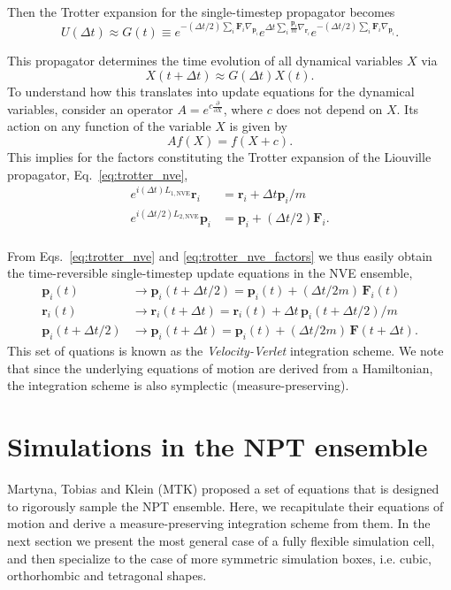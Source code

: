 \documentclass[12pt,letter]{article}
\renewcommand{\vec}[1]{\mathbf{#1}}
\begin{document}
Then the Trotter expansion for the single-timestep propagator becomes
\begin{equation}
U(\Delta t) \approx G(t) \equiv e^{-(\Delta t/2) \sum_i \vec F_i \nabla_{\vec{p}_i}} e^{\Delta t \sum_i \frac{\vec p_i}{m} \nabla_{\vec{r}_i}} e^{-(\Delta t/2) \sum_i \vec F_i \nabla_{\vec{p}_i}}.
\label{eq:trotter_nve}
\end{equation}

This propagator determines the time evolution of all dynamical variables $X$
via
\begin{equation}
X(t+\Delta t) \approx G(\Delta t) X(t).
\end{equation}
To understand how this translates into update equations for the dynamical
variables, consider an operator
$A = e^{c \frac{\partial}{\partial X}}$,
where $c$ does not depend on $X$. Its action on any function of the variable
$X$ is given by
\begin{equation}
A f(X) = f(X+c).
\label{eq:direct_translation}
\end{equation}
This implies for the factors constituting the Trotter expansion of the 
Liouville propagator, Eq.~\eqref{eq:trotter_nve},
\begin{align}
e^{i (\Delta t) L_{1,\mathrm{NVE}}} \vec r_i &= \vec r_i + \Delta t \vec p_i/m \\
e^{i (\Delta t/2) L_{2,\mathrm{NVE}}} \vec p_i &= \vec p_i + (\Delta t/2) \vec F_i. \\
\label{eq:trotter_nve_factors}
\end{align}

From Eqs.~\eqref{eq:trotter_nve} and
\eqref{eq:trotter_nve_factors} we thus easily obtain the time-reversible
single-timestep update equations in the NVE ensemble,
\begin{align}
\vec p_i(t) &\to \vec p_i(t+\Delta t/2) = \vec p_i(t) + (\Delta t/2m)\, \vec F_i(t)\\
\vec r_i(t) &\to \vec r_i(t+\Delta t) = \vec r_i(t) + \Delta t\, \vec p_i(t+\Delta t/2)/m\\
\vec p_i(t+\Delta t/2) &\to \vec p_i(t+\Delta t) = \vec p_i(t) + (\Delta t/2m)\, \vec F(t+\Delta t).
\end{align}
This set of quations is known as the {\em Velocity-Verlet} integration scheme.
We note that since the underlying equations of motion are derived from
a Hamiltonian, the integration scheme is also symplectic (measure-preserving).

\section{Simulations in the NPT ensemble}
Martyna, Tobias and Klein \cite{Martyna1994} (MTK) proposed a set of equations
that is designed to rigorously sample the NPT ensemble. Here, we recapitulate their equations of motion and derive a measure-preserving integration scheme from them. In the next section we present the most general case of a fully flexible simulation cell, and then specialize to the case of more symmetric simulation boxes, i.e. cubic, orthorhombic and tetragonal shapes.
\end{document}
